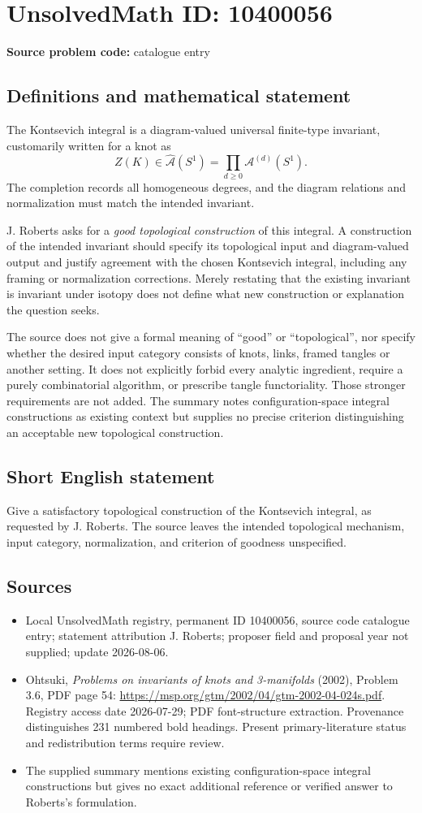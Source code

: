 \documentclass[11pt]{article}
\begin{document}
\section*{UnsolvedMath ID: 10400056}
\textbf{Source problem code:} catalogue entry
\subsection{Definitions and mathematical statement}
The Kontsevich integral is a diagram-valued universal finite-type invariant, customarily written for a knot as
\[
 Z(K)\in\widehat{\mathcal A}(S^1)=\prod_{d\geq0}\mathcal A^{(d)}(S^1).
\]
The completion records all homogeneous degrees, and the diagram relations and normalization must match the intended invariant.

J. Roberts asks for a \emph{good topological construction} of this integral. A construction of the intended invariant should specify its topological input and diagram-valued output and justify agreement with the chosen Kontsevich integral, including any framing or normalization corrections. Merely restating that the existing invariant is invariant under isotopy does not define what new construction or explanation the question seeks.

The source does not give a formal meaning of ``good'' or ``topological'', nor specify whether the desired input category consists of knots, links, framed tangles or another setting. It does not explicitly forbid every analytic ingredient, require a purely combinatorial algorithm, or prescribe tangle functoriality. Those stronger requirements are not added. The summary notes configuration-space integral constructions as existing context but supplies no precise criterion distinguishing an acceptable new topological construction.
\subsection{Short English statement}
Give a satisfactory topological construction of the Kontsevich integral, as requested by J. Roberts. The source leaves the intended topological mechanism, input category, normalization, and criterion of goodness unspecified.
\subsection{Sources}
\begin{itemize}
\item Local UnsolvedMath registry, permanent ID 10400056, source code catalogue entry; statement attribution J. Roberts; proposer field and proposal year not supplied; update 2026-08-06.
\item Ohtsuki, \emph{Problems on invariants of knots and 3-manifolds} (2002), Problem 3.6, PDF page 54: \url{https://msp.org/gtm/2002/04/gtm-2002-04-024s.pdf}. Registry access date 2026-07-29; PDF font-structure extraction. Provenance distinguishes 231 numbered bold headings. Present primary-literature status and redistribution terms require review.
\item The supplied summary mentions existing configuration-space integral constructions but gives no exact additional reference or verified answer to Roberts's formulation.
\end{itemize}
\end{document}
